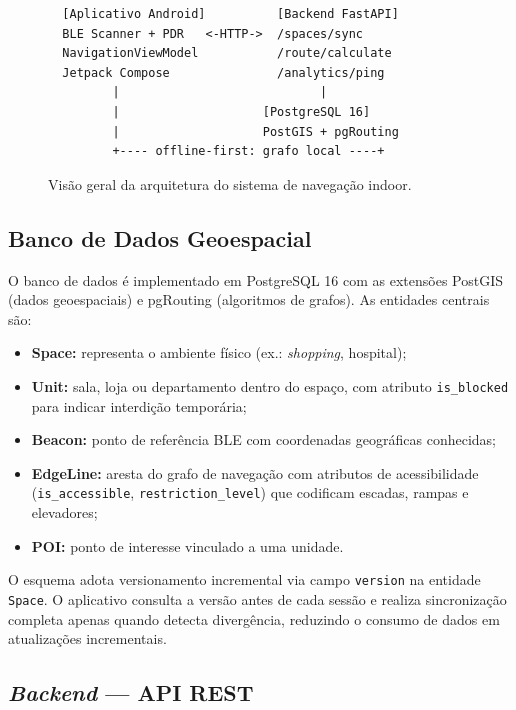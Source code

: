 \documentclass[12pt]{article}
\begin{document}
\begin{figure}[ht]
\centering
\begin{verbatim}
  [Aplicativo Android]          [Backend FastAPI]
  BLE Scanner + PDR   <-HTTP->  /spaces/sync
  NavigationViewModel           /route/calculate
  Jetpack Compose               /analytics/ping
         |                            |
         |                    [PostgreSQL 16]
         |                    PostGIS + pgRouting
         +---- offline-first: grafo local ----+
\end{verbatim}
\caption{Visão geral da arquitetura do sistema de navegação indoor.}
\label{fig:arquitetura}
\end{figure}

\subsection{Banco de Dados Geoespacial}

O banco de dados é implementado em PostgreSQL 16 com as extensões PostGIS (dados
geoespaciais) e pgRouting (algoritmos de grafos). As entidades centrais são:

\begin{itemize}
  \item \textbf{Space:} representa o ambiente físico (ex.: \textit{shopping}, hospital);
  \item \textbf{Unit:} sala, loja ou departamento dentro do espaço, com atributo
        \texttt{is\_blocked} para indicar interdição temporária;
  \item \textbf{Beacon:} ponto de referência BLE com coordenadas geográficas conhecidas;
  \item \textbf{EdgeLine:} aresta do grafo de navegação com atributos de acessibilidade
        (\texttt{is\_accessible}, \texttt{restriction\_level}) que codificam escadas,
        rampas e elevadores;
  \item \textbf{POI:} ponto de interesse vinculado a uma unidade.
\end{itemize}

O esquema adota versionamento incremental via campo \texttt{version} na entidade
\texttt{Space}. O aplicativo consulta a versão antes de cada sessão e realiza
sincronização completa apenas quando detecta divergência, reduzindo o consumo de
dados em atualizações incrementais.

\subsection{\textit{Backend} — API REST}
\end{document}
